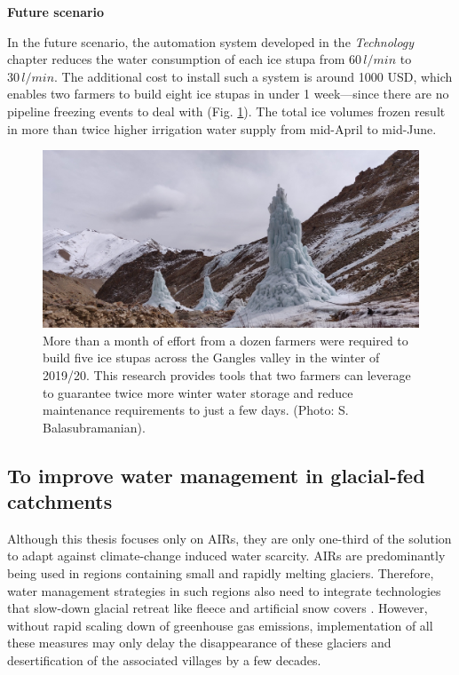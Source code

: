 \textbf{Future scenario}

In the future scenario, the automation system developed in the \textit{Technology} chapter reduces the water
consumption of each ice stupa from $60\,l/min$ to $30\,l/min$. The additional cost to install such a system is
around 1000 USD, which enables two farmers to build eight ice stupas in under 1 week---since there are no pipeline freezing events to deal with (Fig. \ref{fig:icestupa_valley}). The total ice
volumes frozen result in more than twice higher irrigation water supply from mid-April to
mid-June.

\begin{figure}[htb]
	\includegraphics[width=\textwidth]{figs/icestupa_valley}

  \caption{More than a month of effort from a dozen farmers were required to build five ice stupas across the
  Gangles valley in the winter of 2019/20. This research provides tools that two farmers can leverage to
  guarantee twice more winter water storage and reduce maintenance requirements to just a few days. (Photo:
  S. Balasubramanian).}

	\label{fig:icestupa_valley}
\end{figure}

\subsection{To improve water management in glacial-fed catchments}
Although this thesis focuses only on \ac{AIRs}, they are only one-third of the solution to adapt against climate-change
induced water scarcity. \ac{AIRs} are predominantly being used in regions containing small and rapidly melting
glaciers. Therefore, water management strategies in such regions also need to integrate technologies that
slow-down glacial retreat like fleece and artificial snow covers \citep{hussQuantifyingOverallEffect2021a,
oerlemansSlowingRetreatMorteratsch2017, olefsNumericalSimulationsArtificial2007a, liuQuantifyingArtificialReduction2022a}.
However, without rapid scaling down of greenhouse gas emissions, implementation of all these measures may only delay the disappearance of these glaciers and
desertification of the associated villages by a few decades. 

